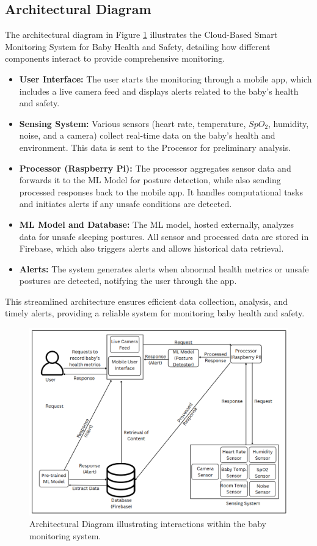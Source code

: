 \documentclass[12pt,a4paper]{report}
\begin{document}
\subsection{Architectural Diagram}
The architectural diagram in Figure \ref{fig:architecture} illustrates the Cloud-Based Smart Monitoring System for Baby Health and Safety, detailing how different components interact to provide comprehensive monitoring.
\begin{itemize}
  \item \textbf{User Interface:} The user starts the monitoring through a mobile app, which includes a live camera feed and displays alerts related to the baby’s health and safety.
  \item \textbf{Sensing System:} Various sensors (heart rate, temperature, $SpO_2$, humidity, noise, and a camera) collect real-time data on the baby’s health and environment. This data is sent to the Processor for preliminary analysis.
  \item \textbf{Processor (Raspberry Pi):} The processor aggregates sensor data and forwards it to the ML Model for posture detection, while also sending processed responses back to the mobile app. It handles computational tasks and initiates alerts if any unsafe conditions are detected.
  \item \textbf{ML Model and Database:} The ML model, hosted externally, analyzes data for unsafe sleeping postures. All sensor and processed data are stored in Firebase, which also triggers alerts and allows historical data retrieval.
  \item \textbf{Alerts:} The system generates alerts when abnormal health metrics or unsafe postures are detected, notifying the user through the app.
\end{itemize}
This streamlined architecture ensures efficient data collection, analysis, and timely alerts, providing a reliable system for monitoring baby health and safety.
\begin{figure}[hbtp]
  \centering
  \includegraphics[scale=0.58]{./pic/finarch.png}
  \caption{Architectural Diagram illustrating interactions within the baby monitoring system.}
  \label{fig:architecture}
\end{figure}
\end{document}
